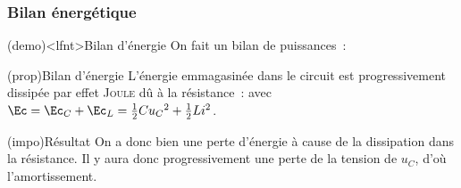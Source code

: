 \documentclass[../../main/main.tex]{subfiles}
\begin{document}
\subsubsection{Bilan énergétique}
\begin{tcb}[label=demo:rcenerg-charge](demo)<lfnt>{Bilan d'énergie}
	On fait un bilan de puissances~:
	\vspace{-15pt}
\end{tcb}
\begin{tcb}[label=prop:lcenerg-décharge](prop){Bilan d'énergie}
	L'énergie emmagasinée dans le circuit est progressivement dissipée par
	effet \textsc{Joule} dû à la résistance~:
	\psw{
		\[
			\boxed{\dv{\Ec}{t} = -\Pc_J}
		\]
	}
	avec $\Ec = \Ec_C + \Ec_L = \frac{1}{2}Cu_C{}^2 + \frac{1}{2}Li^2$.
\end{tcb}
\begin{tcb}[label=impo:amortissement, cnt, bld](impo){Résultat}
	On a donc bien une perte d'énergie à cause de la dissipation dans la
	résistance. Il y aura donc progressivement une perte de la tension
	de $u_C$, d'où l'amortissement.
\end{tcb}
\end{document}
